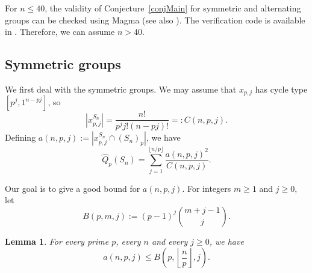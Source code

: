 \documentclass[11pt]{amsart}
\numberwithin{equation}{section}
\newtheorem{lemma}[theorem]{Lemma}
\theoremstyle{definition}
\theoremstyle{remark}
\begin{document}
For $n \leqslant 40$,
the validity of Conjecture~\ref{conjMain} for symmetric and alternating groups
can be checked using {\sc Magma} (see also \cite[Remark 5.3]{BH26}).
The verification code is available in \cite{HLRS26}.
Therefore, we can assume $n > 40$.

\subsection{Symmetric groups}

We first deal with the symmetric groups.
We may assume that $x_{p,j}$ has cycle type $[p^j,1^{n-pj}]$, so
\begin{equation*}
    |x_{p,j}^{S_n}| = \frac{n!}{p^j j! (n-pj)!} =: C(n,p,j).
\end{equation*}
Defining $a(n,p,j) := |x_{p,j}^{S_n} \cap (S_n)_p|$, we have
\begin{equation*}
    \widehat{Q}_p(S_n) = \sum_{j = 1}^{\lfloor n/p \rfloor} \frac{a(n,p,j)^2}{C(n,p,j)}.
\end{equation*}

Our goal is to give a good bound for $a(n,p,j)$.
For integers $m\geqslant1$ and $j\geqslant0$, let
\begin{equation*}
    B(p,m,j) := (p-1)^j{m+j-1\choose j}.
\end{equation*}

\begin{lemma}\label{l:sym_a<B}
    For every prime $p$, every $n$ and every $j\geqslant 0$, we have
    \begin{equation*}
        a(n,p,j) \leqslant B\left( p, \left\lfloor\frac{n}{p}\right\rfloor, j\right).
    \end{equation*}
\end{lemma}
\end{document}
